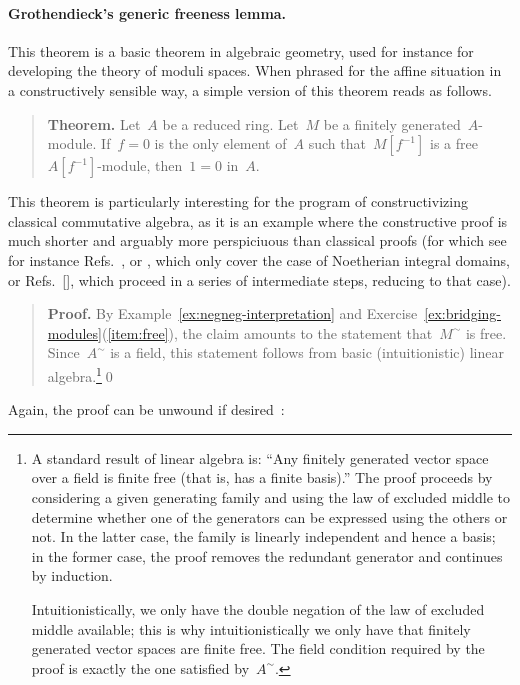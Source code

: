 \documentclass{ws-rv9x6}
\begin{document}
{\paragraph{Grothendieck's generic freeness lemma.} This theorem is a basic
theorem in algebraic geometry, used for instance for developing the theory of
moduli spaces. When phrased for the affine situation in a constructively
sensible way, a simple version of this theorem reads as follows.\par
\begin{quote}
\textbf{Theorem.}
Let~$A$ be a reduced ring. Let~$M$ be a finitely generated~$A$-module.
If~$f = 0$ is the only element of~$A$ such that~$M[f^{-1}]$ is a
free~$A[f^{-1}]$-module, then~$1 = 0$ in~$A$.
\end{quote}
This theorem is particularly interesting for the program of constructivizing
classical commutative algebra, as it is an example where the constructive proof
is much shorter and arguably more perspiciuous than classical proofs (for which
see for instance Refs.~\cite[Lemme~6.9.2]{ega-4-2},
\cite[Thm.~24.1]{matsumura:commutative-ring-theory} or
\cite[Thm.~14.4]{eisenbud:commutative-algebra}, which only cover the case of
Noetherian integral domains, or Refs.~[],
\cite[Tag~051Q]{stacks-project}
which proceed in a series of intermediate steps, reducing to that case).\par
\begin{quote}
\textbf{Proof.} By Example~\ref{ex:negneg-interpretation} and
Exercise~\ref{ex:bridging-modules}(\ref{item:free}), the claim amounts to the statement that~$M^\sim$ is \notnot
free. Since~$A^\sim$ is a field, this statement follows from
basic (intuitionistic) linear algebra.\footnote{A standard result of linear
algebra is: ``Any finitely generated vector space over a field is finite free
(that is, has a finite basis).'' The proof proceeds by considering a given
generating family and using the law of excluded middle to determine whether one
of the generators can be expressed using the others or not. In the latter case,
the family is linearly independent and hence a basis; in the former case, the
proof removes the redundant generator and continues by induction.

Intuitionistically, we only have the double negation of the law of excluded
middle available; this is why intuitionistically we only have that finitely
generated vector spaces are \notnot finite free. The field condition required
by the proof is exactly the one satisfied by~$A^\sim$.}\qed\end{quote}
Again, the proof can be unwound if
desired~\cite[Proposition~3]{blechschmidt:generic-freeness}:

}
\end{document}
